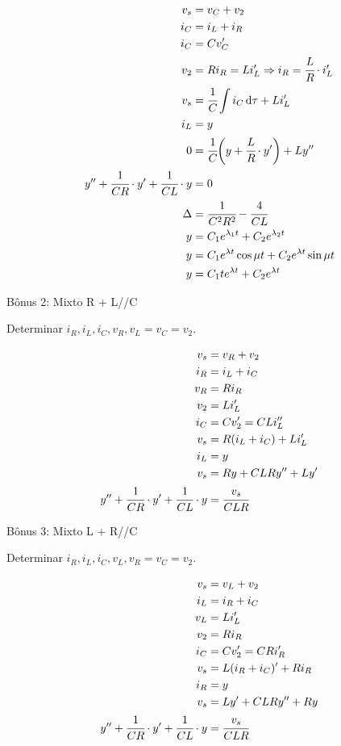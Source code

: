 \documentclass[12pt,a4paper]{article}
\begin{document}
\begin{align}
v_s &= v_C + v_2 \\
i_C &= i_L + i_R \\
i_C &= C v_C' \\
v_2 &= Ri_R = L i_L' \Rightarrow i_R = \cfrac{L}{R}\cdot i_L' \\
v_s &= \cfrac{1}{C}\int i_C\,\mathrm{d}\tau + L i_L' \\
i_L &= y \\
0 &= \cfrac{1}{C} \bigg(y + \cfrac{L}{R}\cdot y' \bigg) + L y'' \\
y'' + \cfrac{1}{CR}\cdot y' + \cfrac{1}{CL} \cdot y &= 0 \\
\Delta &= \cfrac{1}{C^2 R^2} - \cfrac{4}{CL} \\
y &= C_1 e^{\lambda_1 t} + C_2 e^{\lambda_2 t} \\
y &= C_1 e^{\lambda t} \cos \mu t + C_2 e^{\lambda t} \sin \mu t \\
y &= C_1 t e^{\lambda t} + C_2 e^{\lambda t}
\end{align}

\vspace{100mm}

\Large

B\^onus 2: Mixto R + L//C

\normalsize

Determinar $i_R, i_L, i_C, v_R, v_L = v_C = v_2$.

\begin{align}
v_s &= v_R + v_2 \\
i_R &= i_L + i_C \\
v_R &= Ri_R \\
v_2 &= L i_L' \\
i_C &= C v_2' = CL i_L'' \\
v_s &= R(i_L + i_C) + L i_L' \\
i_L &= y \\
v_s &= R y + CLR y'' + L y' \\
y'' + \cfrac{1}{CR}\cdot y' + \cfrac{1}{CL}\cdot y &= \cfrac{v_s}{CLR}
\end{align}

\Large

B\^onus 3: Mixto L + R//C

\normalsize

Determinar $i_R, i_L, i_C, v_L, v_R = v_C = v_2$.

\begin{align}
v_s &= v_L + v_2 \\
i_L &= i_R + i_C \\
v_L &= L i_L' \\
v_2 &= Ri_R \\
i_C &= C v_2' = CR i_R' \\
v_s &= L (i_R + i_C)' + R i_R \\
i_R &= y \\
v_s &= L y' + CLR y'' + R y \\
y'' + \cfrac{1}{CR}\cdot y' + \cfrac{1}{CL}\cdot y &= \cfrac{v_s}{CLR}
\end{align}
\end{document}

